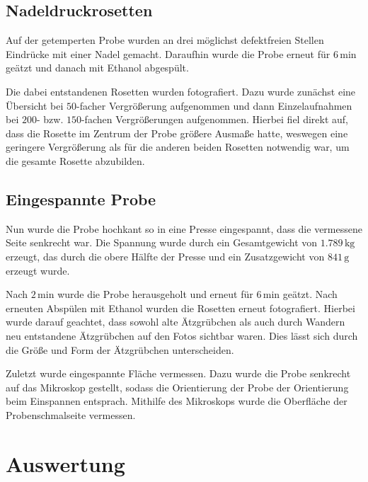 \documentclass[12pt,a4paper]{scrartcl}
\numberwithin{equation}{section} %
\renewcommand{\[}{} %
\renewcommand{\]}{\noindent} %
\begin{document}
\hypertarget{nadeldruckrosetten}{%
\subsection{Nadeldruckrosetten}\label{nadeldruckrosetten}}

Auf der getemperten Probe wurden an drei möglichst defektfreien Stellen
Eindrücke mit einer Nadel gemacht. Daraufhin wurde die Probe erneut für
\(6\mathrm{\,min}\) geätzt und danach mit Ethanol abgespült.

Die dabei entstandenen Rosetten wurden fotografiert. Dazu wurde zunächst
eine Übersicht bei \(50\)-facher Vergrößerung aufgenommen und dann
Einzelaufnahmen bei \(200\)- bzw. \(150\)-fachen Vergrößerungen
aufgenommen. Hierbei fiel direkt auf, dass die Rosette im Zentrum der
Probe größere Ausmaße hatte, weswegen eine geringere Vergrößerung als
für die anderen beiden Rosetten notwendig war, um die gesamte Rosette
abzubilden.

\hypertarget{eingespannte-probe}{%
\subsection{Eingespannte Probe}\label{eingespannte-probe}}

Nun wurde die Probe hochkant so in eine Presse eingespannt, dass die
vermessene Seite senkrecht war. Die Spannung wurde durch ein
Gesamtgewicht von \(1.789\mathrm{\,kg}\) erzeugt, das durch die obere
Hälfte der Presse und ein Zusatzgewicht von \(841\mathrm{\,g}\) erzeugt
wurde.

Nach \(2\mathrm{\,min}\) wurde die Probe herausgeholt und erneut für
\(6\mathrm{\,min}\) geätzt. Nach erneuten Abspülen mit Ethanol wurden
die Rosetten erneut fotografiert. Hierbei wurde darauf geachtet, dass
sowohl alte Ätzgrübchen als auch durch Wandern neu entstandene
Ätzgrübchen auf den Fotos sichtbar waren. Dies lässt sich durch die
Größe und Form der Ätzgrübchen unterscheiden.

Zuletzt wurde eingespannte Fläche vermessen. Dazu wurde die Probe
senkrecht auf das Mikroskop gestellt, sodass die Orientierung der Probe
der Orientierung beim Einspannen entsprach. Mithilfe des Mikroskops
wurde die Oberfläche der Probenschmalseite vermessen.

\hypertarget{auswertung}{%
\section{Auswertung}\label{auswertung}}
\end{document}
